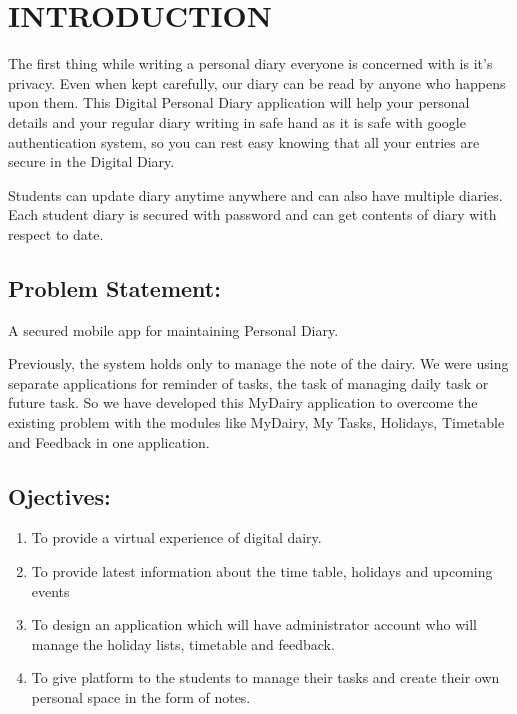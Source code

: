 \documentclass[12pt,a4paper]{report}
\begin{document}
\hspace{1cm}\listoffigures
\clearpage
\listoftables
\clearpage
{}
\pagestyle{fancy}
\fancyhf{}
\fancyhead[R]{\tiny \leftmark} 
\cfoot[\hline ]{\thepage}
\renewcommand{\headrulewidth}{0pt}
\renewcommand{\footrulewidth}{0pt}




\chapterfont{}
\setcounter{secnumdepth}{4}
\chapter {INTRODUCTION}
The first thing while writing a personal diary everyone is concerned with is it's privacy. Even when kept carefully, our diary can be read by anyone who happens upon them. This Digital Personal Diary application will help your personal details and your regular diary writing in safe hand as it is safe with google authentication system, so you can rest easy knowing that all your entries are secure in the Digital Diary.
\par 
Students can update diary anytime anywhere and can also have multiple diaries. Each student diary is secured with password and can get contents of diary with respect to date.

\section{Problem Statement: }
\par A secured mobile app for maintaining Personal Diary.
\par Previously, the system holds only to manage the note of the dairy. We  were using separate applications for reminder of tasks, the task of managing daily task or future task. So we have developed this MyDairy application to overcome the existing problem with the modules like MyDairy, My Tasks, Holidays, Timetable and Feedback in one application. 

\section{Ojectives: }
\begin{enumerate}[label=\roman*.]
\item To provide a virtual experience of digital dairy.
\item To provide latest information about the time table, holidays and upcoming events 
\item To design an application which will have administrator account who will manage the holiday lists, timetable and feedback. 
\item To give platform to the students to manage their tasks and create their own personal space in the form of notes. 
\end{enumerate}
\end{document}
